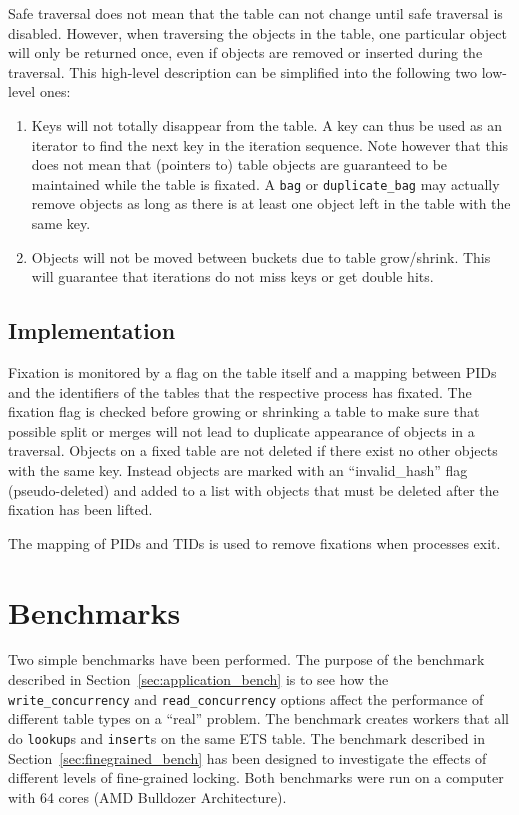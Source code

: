 \documentclass[aps,pre,preprint,nofootinbib]{revtex4}
\begin{document}
Safe traversal does not mean that the table can not change until safe traversal is disabled.
However, when traversing the objects in the table, one particular object will only be returned once, even if objects are removed or inserted during the traversal.
This high-level description can be simplified into the following two low-level ones:

\begin{enumerate}
\item Keys will not totally disappear from the table.
  A key can thus be used as an iterator to find the next key in the iteration sequence.
  Note however that this does not mean that (pointers to) table objects are guaranteed to be maintained while the table is fixated.
  A \verb|bag| or \verb|duplicate_bag| may actually remove objects as long as there is at least one object left in the table with the same key.
\item Objects will not be moved between buckets due to table grow/shrink.
  This will guarantee that iterations do not miss keys or get double hits.
\end{enumerate}

\subsection{Implementation}

Fixation is monitored by a flag on the table itself and a mapping between PIDs and the identifiers of the tables that the respective process has fixated.
The fixation flag is checked before growing or shrinking a table to make sure that possible split or merges will not lead to duplicate appearance of objects in a traversal.
Objects on a fixed table are not deleted if there exist no other objects with the same key.
Instead objects are marked with an ``invalid\_hash'' flag (pseudo-deleted) and added to a list with objects that must be deleted after the fixation has been lifted.

The mapping of PIDs and TIDs is used to remove fixations when processes exit.

\section{Benchmarks} \label{sec:benchmark}

Two simple benchmarks have been performed.
The purpose of the benchmark described in Section~\ref{sec:application_bench} is to see how the \verb|write_concurrency| and \verb|read_concurrency| options affect the performance of different table types on a ``real'' problem.
The benchmark creates workers that all do \verb|lookup|s and \verb|insert|s on the same ETS table.
The benchmark described in Section~\ref{sec:finegrained_bench} has been designed to investigate the effects of different levels of fine-grained locking.
Both benchmarks were run on a computer with 64 cores (AMD Bulldozer Architecture).
\end{document}

